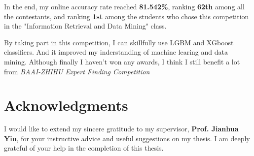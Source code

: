 \documentclass[sigconf]{acmart}
\begin{document}
In the end, my online accuracy rate reached \textbf{81.542\%}, ranking \textbf{62th} among all the contestants, and ranking \textbf{1st} among the students who chose this competition in the "Information Retrieval and Data Mining" class.


By taking part in this competition, I can skillfully use LGBM and XGboost classifiers. And it improved my inderstanding of machine learing and data mining. Although finally I haven't won any awards, I think I still benefit a lot from \textit{BAAI-ZHIHU Expert Finding Competition}


\section{Acknowledgments}

I would like to extend my sincere gratitude to my supervisor, \textbf{Prof. Jianhua Yin}, for your instructive advice and useful suggestions on my thesis. I am deeply grateful of your help in the completion of this thesis.
\end{document}
